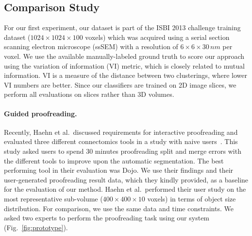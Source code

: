 \subsection{Comparison Study}
\label{sec:comparisonstudy}
For our first experiment, our dataset is part of the ISBI 2013 challenge training dataset ($1024\times1024\times100$ voxels) which was acquired using a serial section scanning electron microscope (ssSEM) with a resolution of $6\times6\times30\, nm$ per voxel. We use the available manually-labeled ground truth to score our approach using the variation of information (VI) metric, which is closely related to mutual information. VI is a measure of the distance between two clusterings, where lower VI numbers are better. Since our classifiers are trained on 2D image slices, we perform all evaluations on slices rather than 3D volumes.


\paragraph{Guided proofreading.}
Recently, Haehn et al.~discussed requirements for interactive proofreading and evaluated three different connectomics tools in a study with naive users~\cite{haehn_dojo_2014}. This study asked users to spend 30 minutes proofreading split and merge errors with the different tools to improve upon the automatic segmentation. The best performing tool in their evaluation was Dojo. We use their findings and their user-generated proofreading result data, which they kindly provided, as a baseline for the evaluation of our method.
Haehn et al.~performed their user study on the most representative sub-volume ($400\times400\times10$ voxels) in terms of object size distribution. For comparison, we use the same data and time constraints. We asked two experts to perform the proofreading task using our system (Fig.~\ref{fig:prototype}).

